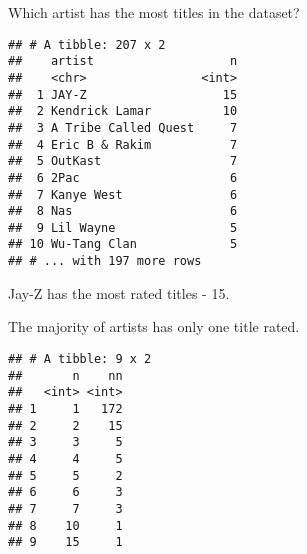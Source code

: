 \documentclass[
]{article}
\newenvironment{Shaded}{\begin{snugshade}}{\end{snugshade}}
\newcommand{\DataTypeTok}[1]{\textcolor[rgb]{0.13,0.29,0.53}{#1}}
\newcommand{\KeywordTok}[1]{\textcolor[rgb]{0.13,0.29,0.53}{\textbf{#1}}}
\newcommand{\NormalTok}[1]{#1}
\newcommand{\OperatorTok}[1]{\textcolor[rgb]{0.81,0.36,0.00}{\textbf{#1}}}
\newcommand{\OtherTok}[1]{\textcolor[rgb]{0.56,0.35,0.01}{#1}}
\newcommand{\StringTok}[1]{\textcolor[rgb]{0.31,0.60,0.02}{#1}}
\begin{document}
Which artist has the most titles in the dataset?

\begin{Shaded}
\end{Shaded}

\begin{verbatim}
## # A tibble: 207 x 2
##    artist                   n
##    <chr>                <int>
##  1 JAY-Z                   15
##  2 Kendrick Lamar          10
##  3 A Tribe Called Quest     7
##  4 Eric B & Rakim           7
##  5 OutKast                  7
##  6 2Pac                     6
##  7 Kanye West               6
##  8 Nas                      6
##  9 Lil Wayne                5
## 10 Wu-Tang Clan             5
## # ... with 197 more rows
\end{verbatim}

Jay-Z has the most rated titles - 15.

The majority of artists has only one title rated.

\begin{Shaded}
\end{Shaded}

\begin{verbatim}
## # A tibble: 9 x 2
##       n    nn
##   <int> <int>
## 1     1   172
## 2     2    15
## 3     3     5
## 4     4     5
## 5     5     2
## 6     6     3
## 7     7     3
## 8    10     1
## 9    15     1
\end{verbatim}

\begin{Shaded}
\end{Shaded}
\end{document}
